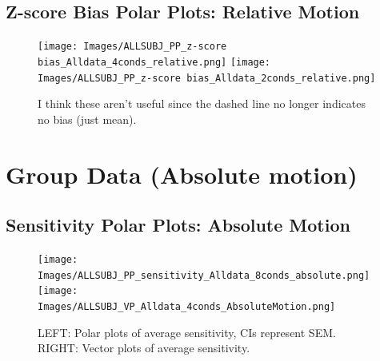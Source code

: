 \documentclass[11pt]{article} %
\begin{document}
\subsection{Z-score Bias Polar Plots: Relative Motion}
\begin{figure}[H]
\centering %
\texttt{[image: Images/ALLSUBJ\_PP\_z-score bias\_Alldata\_4conds\_relative.png]}
\texttt{[image: Images/ALLSUBJ\_PP\_z-score bias\_Alldata\_2conds\_relative.png]}
\caption{I think these aren't useful since the dashed line no longer indicates no bias (just mean).}
\end{figure}

\newpage
\section{Group Data (Absolute motion)}
\subsection{Sensitivity Polar Plots: Absolute Motion}
\begin{figure}[H]
\centering %
\texttt{[image: Images/ALLSUBJ\_PP\_sensitivity\_Alldata\_8conds\_absolute.png]}
\texttt{[image: Images/ALLSUBJ\_VP\_Alldata\_4conds\_AbsoluteMotion.png]}
\caption{LEFT: Polar plots of average sensitivity, CIs represent SEM. RIGHT: Vector plots of average sensitivity.}
\end{figure}
\end{document}
